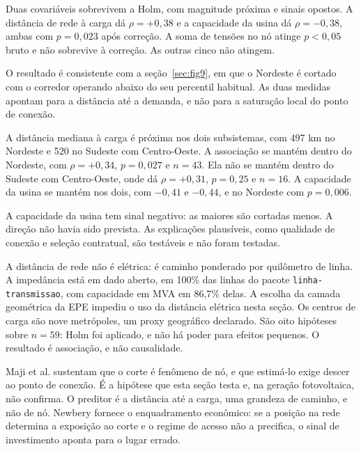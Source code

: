 Duas covariáveis sobrevivem a Holm, com magnitude próxima e sinais opostos. A
distância de rede à carga dá $\rho = +0{,}38$ e a capacidade da usina dá
$\rho = -0{,}38$, ambas com $p = 0{,}023$ após correção. A soma de tensões no nó
atinge $p < 0{,}05$ bruto e não sobrevive à correção. As outras cinco não
atingem.


O resultado é consistente com a seção~\ref{sec:fig9}, em que o Nordeste é
cortado com o corredor operando abaixo do seu percentil habitual. As duas
medidas apontam para a distância até a demanda, e não para a saturação local do
ponto de conexão.

 A distância mediana à carga é próxima
nos dois subsistemas, com 497 km no Nordeste e 520 no Sudeste com Centro-Oeste.
A associação se mantém dentro do Nordeste, com $\rho = +0{,}34$, $p = 0{,}027$ e
$n = 43$. Ela não se mantém dentro do Sudeste com Centro-Oeste, onde dá
$\rho = +0{,}31$, $p = 0{,}25$ e $n = 16$. A capacidade da usina se mantém nos
dois, com $-0{,}41$ e $-0{,}44$, e no Nordeste com $p = 0{,}006$.

 A capacidade da usina tem sinal
negativo: as maiores são cortadas menos. A direção não havia sido prevista. As
explicações plausíveis, como qualidade de conexão e seleção contratual, são
testáveis e não foram testadas.

\begin{objecao}
A distância de rede não é elétrica: é caminho ponderado por quilômetro de linha.
A impedância está em dado aberto, em 100\% das linhas do pacote
\texttt{linha-transmissao}, com capacidade em MVA em 86,7\% delas. A escolha da
camada geométrica da EPE impediu o uso da distância elétrica nesta seção. Os
centros de carga são nove metrópoles, um proxy geográfico declarado. São oito
hipóteses sobre $n = 59$: Holm foi aplicado, e não há poder para efeitos
pequenos. O resultado é associação, e não causalidade.
\end{objecao}

 Maji et al. \cite{maji2025} sustentam que o corte é
fenômeno de nó, e que estimá-lo exige descer ao ponto de conexão. É a hipótese
que esta seção testa e, na geração fotovoltaica, não confirma. O preditor é a
distância até a carga, uma grandeza de caminho, e não de nó. Newbery
\cite{newbery2024} fornece o enquadramento econômico: se a posição na rede
determina a exposição ao corte e o regime de acesso não a precifica, o sinal de
investimento aponta para o lugar errado.

